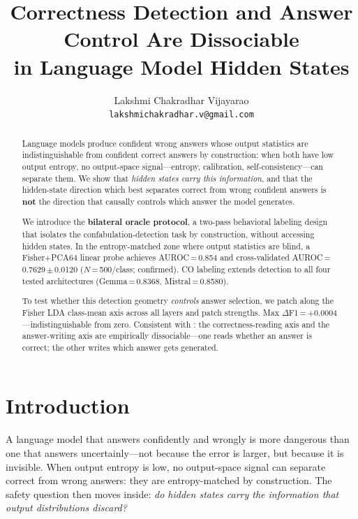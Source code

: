 \documentclass[11pt,twocolumn]{article}
\title{Correctness Detection and Answer Control Are Dissociable\\
       in Language Model Hidden States}
\author{%
  Lakshmi Chakradhar Vijayarao \\
  \texttt{lakshmichakradhar.v@gmail.com}
}
\begin{document}
\maketitle

\begin{abstract}
Language models produce confident wrong answers whose output statistics are
indistinguishable from confident correct answers by construction: when both have
low output entropy, no output-space signal---entropy, calibration,
self-consistency---can separate them. We show that \emph{hidden states carry this
information}, and that the hidden-state direction which best separates correct from
wrong confident answers is \textbf{not} the direction that causally controls which
answer the model generates.

We introduce the \textbf{bilateral oracle protocol}, a two-pass behavioral labeling
design that isolates the confabulation-detection task by construction, without
accessing hidden states. In the entropy-matched zone where output statistics are
blind, a Fisher+PCA64 linear probe achieves AUROC\,=\,0.854 and cross-validated
AUROC\,=\,0.7629\,$\pm$\,0.0120 ($N$\,=\,500/class; confirmed). CO labeling extends
detection to all four tested architectures (Gemma\,=\,0.8368, Mistral\,=\,0.8580).

To test whether this detection geometry \emph{controls} answer selection, we patch
along the Fisher LDA class-mean axis across all layers and patch strengths. Max
$\Delta$F1\,=\,$+$0.0004---indistinguishable from zero. Consistent with
\citet{cox2026decoding}: the correctness-reading axis and the answer-writing axis
are empirically dissociable---one reads whether an answer is correct; the other
writes which answer gets generated.
\end{abstract}

\section{Introduction}

A language model that answers confidently and wrongly is more dangerous than one
that answers uncertainly---not because the error is larger, but because it is
invisible. When output entropy is low, no output-space signal can separate correct
from wrong answers: they are entropy-matched by construction. The safety question
then moves inside: \emph{do hidden states carry the information that output
distributions discard?}
\end{document}
